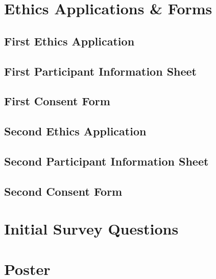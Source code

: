 
\chapter{Ethics Applications \& Forms}

\section{First Ethics Application}
\label{appx:1-ea}



\section{First Participant Information Sheet}
\label{appx:1-pi}


\section{First Consent Form}
\label{appx:1-consent}


\section{Second Ethics Application}
\label{appx:2-ea}


\section{Second Participant Information Sheet}
\label{appx:2-pi}


\section{Second Consent Form}
\label{appx:2-consent}


\chapter{Initial Survey Questions}
\label{appx:survey}


\chapter{Poster}
\label{appx:poster}


